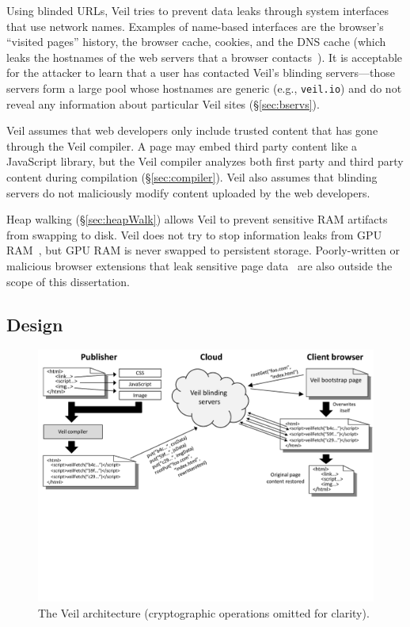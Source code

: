 Using blinded URLs, Veil tries to prevent data leaks
through system interfaces that use network names.
Examples of name-based interfaces are the browser's ``visited pages''
history, the browser cache, cookies, and the DNS
cache (which leaks the hostnames of the web servers
that a browser contacts~\cite{aggarwal10}). It is
acceptable for the attacker to learn that a user
has contacted Veil's blinding servers---those
servers form a large pool whose hostnames are generic
(e.g., \texttt{veil.io}) and do not reveal
any information about particular Veil sites
(\S\ref{sec:bservs}).

Veil assumes that web developers only include
trusted content that has gone through the Veil
compiler. A page may embed third party content like a JavaScript
library, but the Veil compiler analyzes both
first party and third party content during compilation
(\S\ref{sec:compiler}). Veil also assumes
that blinding servers do not maliciously 
modify content uploaded by the web developers.

Heap walking (\S\ref{sec:heapWalk}) allows Veil
to prevent sensitive RAM artifacts from swapping to
disk. Veil does not try to stop information
leaks from GPU RAM~\cite{lee2014}, but GPU RAM
is never swapped to persistent storage. 
Poorly-written or malicious browser extensions that leak
sensitive page data~\cite{lerner13} are also outside the
scope of this dissertation.

\subsection{Design}
\label{sec:design}

\begin{figure}
	\centering
	\includegraphics[width=\textwidth]{veil-figs/arch_small_cropped}
	\caption{The Veil architecture (cryptographic operations omitted for clarity).}
	\label{fig:arch}
\end{figure}

